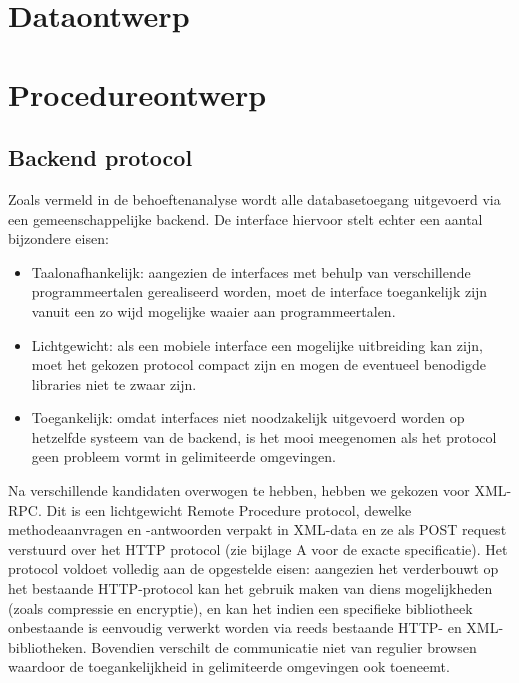 \chapter{Dataontwerp}


\chapter{Procedureontwerp}

\section{Backend protocol}

Zoals vermeld in de behoeftenanalyse wordt alle databasetoegang uitgevoerd via een gemeenschappelijke backend. De interface hiervoor stelt echter een aantal bijzondere eisen:
\begin{itemize}
\item{Taalonafhankelijk: aangezien de interfaces met behulp van verschillende programmeertalen gerealiseerd worden, moet de interface toegankelijk zijn vanuit een zo wijd mogelijke waaier aan programmeertalen.}
\item{Lichtgewicht: als een mobiele interface een mogelijke uitbreiding kan zijn, moet het gekozen protocol compact zijn en mogen de eventueel benodigde libraries niet te zwaar zijn.}
\item{Toegankelijk: omdat interfaces niet noodzakelijk uitgevoerd worden op hetzelfde systeem van de backend, is het mooi meegenomen als het protocol geen probleem vormt in gelimiteerde omgevingen.}
\end{itemize}

Na verschillende kandidaten overwogen te hebben, hebben we gekozen voor XML-RPC. Dit is een lichtgewicht Remote Procedure protocol, dewelke methodeaanvragen en -antwoorden verpakt in XML-data en ze als POST request verstuurd over het HTTP protocol (zie bijlage A voor de exacte specificatie).
Het protocol voldoet volledig aan de opgestelde eisen: aangezien het verderbouwt op het bestaande HTTP-protocol kan het gebruik maken van diens mogelijkheden (zoals compressie en encryptie), en kan het indien een specifieke bibliotheek onbestaande is eenvoudig verwerkt worden via reeds bestaande HTTP- en XML-bibliotheken. Bovendien verschilt de communicatie niet van regulier browsen waardoor de toegankelijkheid in gelimiteerde omgevingen ook toeneemt.

